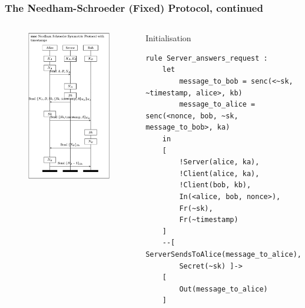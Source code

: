 \documentclass[aspectratio=169,t,xcolor=table]{beamer}
\begin{document}
\begin{frame}[fragile]
    \frametitle{The Needham-Schroeder (Fixed) Protocol, continued}
    \begin{columns}
        \begin{figure}
            \centering
            \includegraphics[width=.8\textwidth]{images/NS_Fixed.png}
        \end{figure}
        \begin{block}{Initialisation}
            \begin{lstlisting}[language=Tamarin]
rule Server_answers_request :
    let
        message_to_bob = senc(<~sk, ~timestamp, alice>, kb)
        message_to_alice = senc(<nonce, bob, ~sk, message_to_bob>, ka)
    in
    [
        !Server(alice, ka),
        !Client(alice, ka),
        !Client(bob, kb),
        In(<alice, bob, nonce>),
        Fr(~sk),
        Fr(~timestamp)
    ]
    --[ ServerSendsToAlice(message_to_alice),
        Secret(~sk) ]->
    [
        Out(message_to_alice)
    ]\end{lstlisting}
        \end{block}
    \end{columns}
\end{frame}
\end{document}
